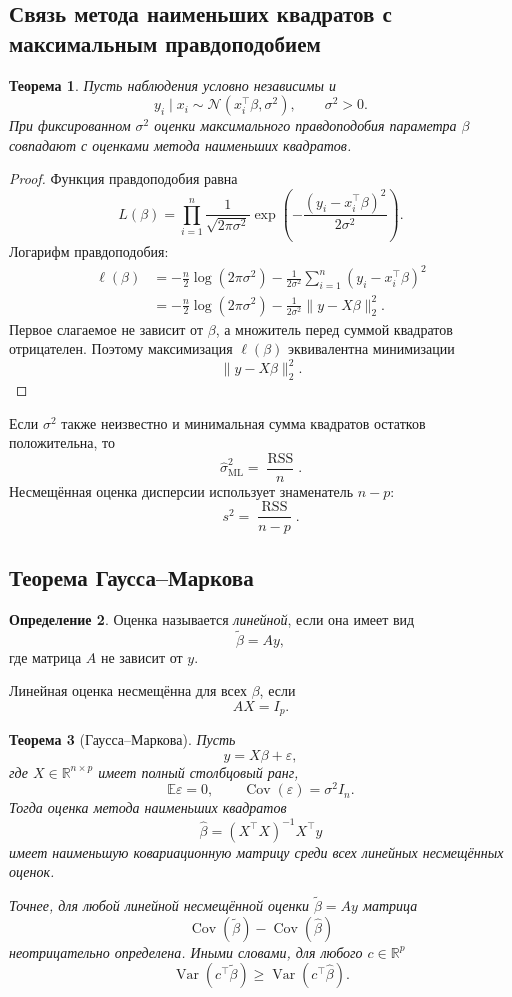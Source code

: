 \documentclass[12pt,a4paper]{article}
\newtheorem{theorem}{Теорема}[section]
\theoremstyle{definition}
\newtheorem{definition}[theorem]{Определение}
\theoremstyle{remark}
\newcommand{\R}{\mathbb{R}}
\newcommand{\E}{\mathbb{E}}
\newcommand{\Var}{\operatorname{Var}}
\newcommand{\Cov}{\operatorname{Cov}}
\begin{document}
\subsection{Связь метода наименьших квадратов с максимальным правдоподобием}

\begin{theorem}
Пусть наблюдения условно независимы и
\[
    y_i\mid x_i
    \sim
    \mathcal{N}(x_i^\top\beta,\sigma^2),
    \qquad
    \sigma^2>0.
\]
При фиксированном $\sigma^2$ оценки максимального правдоподобия параметра
$\beta$ совпадают с оценками метода наименьших квадратов.
\end{theorem}

\begin{proof}
Функция правдоподобия равна
\[
    L(\beta)
    =
    \prod_{i=1}^{n}
    \frac{1}{\sqrt{2\pi\sigma^2}}
    \exp
    \left(
        -\frac{(y_i-x_i^\top\beta)^2}{2\sigma^2}
    \right).
\]
Логарифм правдоподобия:
\[
\begin{split}
    \ell(\beta)
    &=
    -\frac{n}{2}\log(2\pi\sigma^2)
    -
    \frac{1}{2\sigma^2}
    \sum_{i=1}^{n}
    (y_i-x_i^\top\beta)^2\\
    &=
    -\frac{n}{2}\log(2\pi\sigma^2)
    -
    \frac{1}{2\sigma^2}
    \|y-X\beta\|_2^2.
\end{split}
\]
Первое слагаемое не зависит от $\beta$, а множитель перед суммой квадратов
отрицателен. Поэтому максимизация $\ell(\beta)$ эквивалентна минимизации
\[
    \|y-X\beta\|_2^2.
\]
\end{proof}

Если $\sigma^2$ также неизвестно и минимальная сумма квадратов остатков
положительна, то
\[
    \widehat\sigma_{\mathrm{ML}}^2
    =
    \frac{\operatorname{RSS}}{n}.
\]
Несмещённая оценка дисперсии использует знаменатель $n-p$:
\[
    s^2=\frac{\operatorname{RSS}}{n-p}.
\]

\subsection{Теорема Гаусса--Маркова}

\begin{definition}
Оценка называется \emph{линейной}, если она имеет вид
\[
    \widetilde\beta=Ay,
\]
где матрица $A$ не зависит от $y$.

Линейная оценка несмещённа для всех $\beta$, если
\[
    AX=I_p.
\]
\end{definition}

\begin{theorem}[Гаусса--Маркова]
Пусть
\[
    y=X\beta+\varepsilon,
\]
где $X\in\R^{n\times p}$ имеет полный столбцовый ранг,
\[
    \E\varepsilon=0,
    \qquad
    \Cov(\varepsilon)=\sigma^2I_n.
\]
Тогда оценка метода наименьших квадратов
\[
    \widehat\beta
    =
    (X^\top X)^{-1}X^\top y
\]
имеет наименьшую ковариационную матрицу среди всех линейных несмещённых
оценок.

Точнее, для любой линейной несмещённой оценки
$\widetilde\beta=Ay$ матрица
\[
    \Cov(\widetilde\beta)
    -
    \Cov(\widehat\beta)
\]
неотрицательно определена. Иными словами, для любого $c\in\R^p$
\[
    \Var(c^\top\widetilde\beta)
    \geq
    \Var(c^\top\widehat\beta).
\]
\end{theorem}
\end{document}
